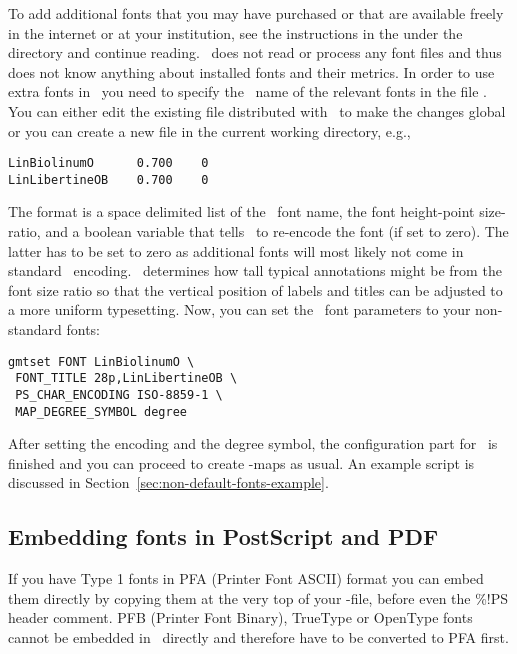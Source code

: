 To add additional fonts that you may have purchased or that are
available freely in the internet or at your institution, see the
instructions in the  under the
 directory and continue reading.
%
\GMT\ does not read or process any font files and thus does not
know anything about installed fonts and their metrics. In order to
use extra fonts in \GMT\ you need to specify the \PS\ name of the
relevant fonts in the file . You
can either edit the existing file distributed with \GMT\ to make
the changes global or you can create a new file in the current
working directory, e.g.,
%
\begin{verbatim}
LinBiolinumO      0.700    0
LinLibertineOB    0.700    0
\end{verbatim}
%
The format is a space delimited list of the \PS\ font name, the
font height-point size-ratio, and a boolean variable that tells
\GMT\ to re-encode the font (if set to zero). The latter has to be
set to zero as additional fonts will most likely not come in
standard \PS\ encoding. \GMT\ determines how tall typical
annotations might be from the font size ratio so that the vertical
position of labels and titles can be adjusted to a more uniform
typesetting. Now, you can set the \GMT\ font parameters to your
non-standard fonts:
%
\begin{verbatim}
gmtset FONT LinBiolinumO \
 FONT_TITLE 28p,LinLibertineOB \
 PS_CHAR_ENCODING ISO-8859-1 \
 MAP_DEGREE_SYMBOL degree
\end{verbatim}
%
After setting the encoding and the degree symbol, the
configuration part for \GMT\ is finished and you can proceed to
create \GMT-maps as usual. An example script is discussed in
Section~\ref{sec:non-default-fonts-example}.


\subsection{Embedding fonts in PostScript and PDF}

If you have Type 1 fonts in PFA (Printer Font ASCII) format you
can embed them directly by copying them at the very top of your
\PS-file, before even the \%!PS header comment. PFB (Printer Font
Binary), TrueType or OpenType fonts cannot be embedded in \PS\
directly and therefore have to be converted to PFA first.

